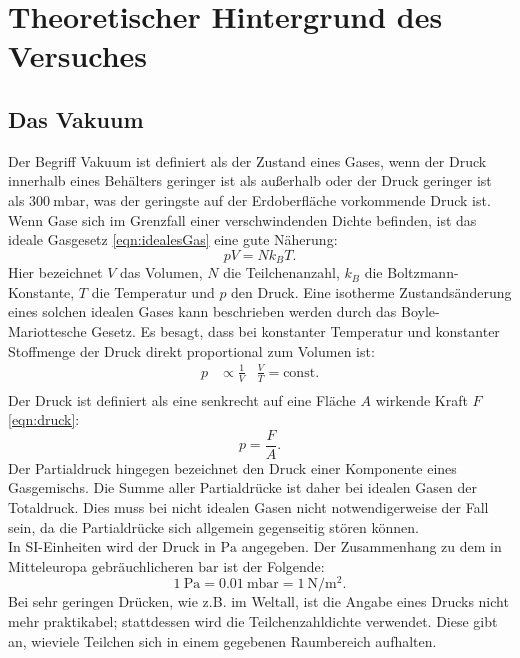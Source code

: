 \section{Theoretischer Hintergrund des Versuches}
\label{sec:Theorie}

\subsection{Das Vakuum}
Der Begriff Vakuum ist definiert als der Zustand eines Gases, wenn der Druck
innerhalb eines Behälters geringer ist als außerhalb oder der Druck geringer
ist als $\SI{300}{\milli\bar}$, was der geringste auf der Erdoberfläche
vorkommende Druck ist.\\
Wenn Gase sich im Grenzfall einer verschwindenden Dichte befinden, ist das
ideale Gasgesetz \ref{eqn:idealesGas} eine gute Näherung:
\begin{equation}
 pV = N k_{B} T.
 \label{eqn:idealesGas}
\end{equation}
Hier bezeichnet $V$ das Volumen, $N$ die Teilchenanzahl, $k_{B}$ die
Boltzmann-Konstante, $T$ die Temperatur und $p$ den Druck.
Eine isotherme Zustandsänderung eines solchen idealen Gases kann beschrieben
werden durch das Boyle-Mariottesche Gesetz.
Es besagt, dass bei konstanter Temperatur und konstanter Stoffmenge der Druck direkt
proportional zum Volumen ist:
\begin{align}
  p & \propto \frac{1}{V} & \frac{V}{T} = \text{const}.\\
  \label{eqn:boylemariotte}
\end{align}
Der Druck ist definiert als eine senkrecht auf eine Fläche $A$ wirkende Kraft $F$ \ref{eqn:druck}:
\begin{equation}
  p = \frac{F}{A}.
  \label{eqn:druck}
\end{equation}
Der Partialdruck hingegen bezeichnet den Druck einer Komponente eines Gasgemischs.
Die Summe aller Partialdrücke ist daher bei idealen Gasen der Totaldruck. Dies
muss bei nicht idealen Gasen nicht notwendigerweise der Fall sein, da die Partialdrücke
sich allgemein gegenseitig stören können.\\
In SI-Einheiten wird der Druck in $\si{\pascal}$ angegeben. Der Zusammenhang zu dem
in Mitteleuropa gebräuchlicheren $\si{\bar}$ ist der Folgende:
\begin{equation}
 \SI{1}{\pascal} = \SI{0.01}{\milli\bar} = \SI{1}{\newton\per\square\meter}.
\end{equation}
Bei sehr geringen Drücken, wie z.B. im Weltall, ist die Angabe eines Drucks nicht
mehr praktikabel; stattdessen wird die Teilchenzahldichte verwendet. Diese gibt an,
wieviele Teilchen sich in einem gegebenen Raumbereich aufhalten.

